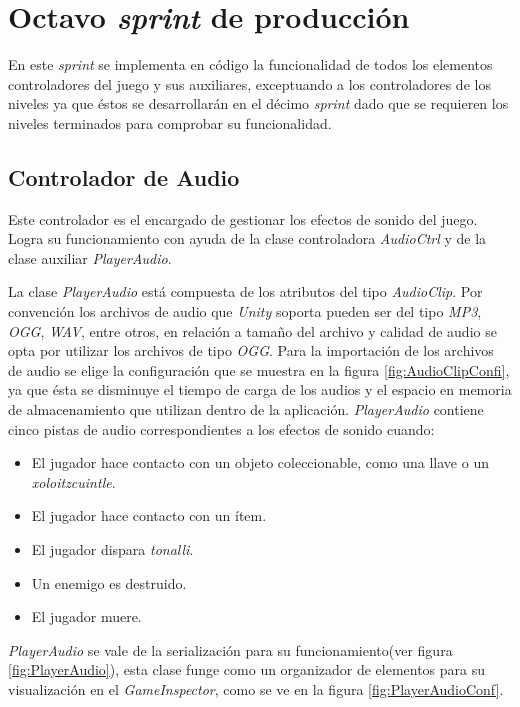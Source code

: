 \section{Octavo \textit{sprint} de producción}
En este \textit{sprint} se implementa en código la funcionalidad de todos los
elementos controladores del juego y sus auxiliares, exceptuando a los
controladores de los niveles ya que éstos se desarrollarán en el décimo
\textit{sprint} dado que se requieren los niveles terminados para comprobar su
funcionalidad.

\subsection{Controlador de Audio}
Este controlador es el encargado de gestionar los efectos de sonido del
juego. Logra su funcionamiento con ayuda de la clase controladora
\textit{AudioCtrl} y de la clase auxiliar \textit{PlayerAudio}.
\\
\par
La clase \textit{PlayerAudio} está compuesta de los atributos del tipo
\textit{AudioClip}. Por convención los archivos de audio que \textit{Unity}
soporta pueden ser del tipo \textit{MP3}, \textit{OGG}, \textit{WAV}, entre
otros, en relación a tamaño del archivo y calidad de audio se opta por utilizar
los archivos de tipo \textit{OGG}. Para la importación de los archivos de audio
se elige la configuración que se muestra en la figura \ref{fig:AudioClipConfi},
ya que ésta se disminuye el tiempo de carga de los audios y el espacio en
memoria de almacenamiento que utilizan dentro de la aplicación.
\textit{PlayerAudio} contiene cinco pistas de audio correspondientes a los
efectos de sonido cuando:
    \begin{itemize}
        \item El jugador hace contacto con un objeto coleccionable, como una
        llave o un \textit{xoloitzcuintle}.
        \item El jugador hace contacto con un ítem.
        \item El jugador dispara \textit{tonalli}.
        \item Un enemigo es destruido.
        \item El jugador muere.
    \end{itemize}    

\textit{PlayerAudio} se vale de la serialización para su funcionamiento(ver
figura \ref{fig:PlayerAudio}), esta clase funge como un organizador de elementos
para su visualización en el \textit{GameInspector}, como se ve en la figura
\ref{fig:PlayerAudioConf}.   

